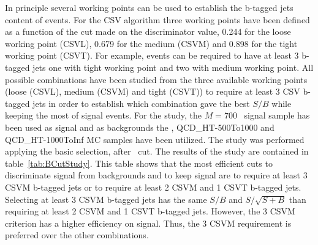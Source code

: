 In principle several working points can be used to establish the b-tagged jets content of events. For the CSV algorithm three working points have been defined as a function of the cut made on the discriminator value, 0.244 for the loose working point (CSVL), 0.679 for the medium (CSVM) and 0.898 for the tight working point (CSVT). For example, events can be required to have at least 3 b-tagged jets one with tight working point and two with medium working point. All possible combinations have been studied from the three available working points (loose (CSVL), medium (CSVM) and tight (CSVT)) to require at least 3 CSV b-tagged jets in order to establish which combination gave the best $S/B$ while keeping the most of signal events. For the study, the $M=700$ \GeVcc~signal sample has been used as signal and as backgrounds the \ttbar, QCD\_HT-500To1000 and QCD\_HT-1000ToInf MC samples have been utilized. The study was performed applying the basic selection, after \HT~cut. The results of the study are contained in table~\ref{tab:BCutStudy}. This table shows that the most efficient cuts to discriminate signal from backgrounds and to keep signal are to require at least 3 CSVM b-tagged jets or to require at least 2 CSVM and 1 CSVT b-tagged jets. Selecting at least 3 CSVM b-tagged jets has the same $S/B$ and $S/\sqrt{S+B}$ than requiring at least 2 CSVM and 1 CSVT b-tagged jets. However, the 3 CSVM criterion has a higher efficiency on signal. Thus, the 3 CSVM requirement is preferred over the other combinations. %

